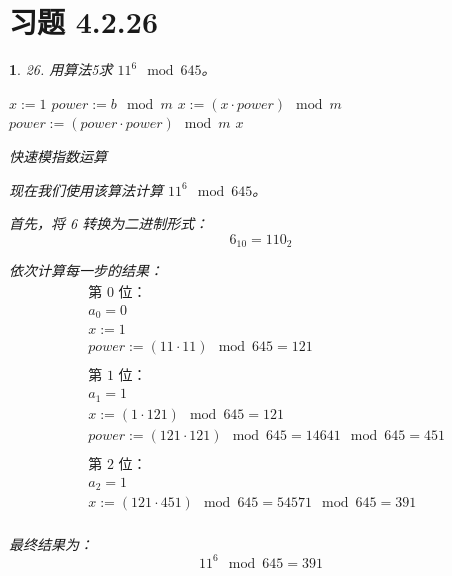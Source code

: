 \documentclass[UTF8]{report}
\theoremstyle{MyLineTheoremStyle} %
\theoremstyle{MyBlockTheoremStyle} %
\theoremstyle{MySubsubsectionStyle} %
\newtheorem{definition}{}
\begin{document}
\section{习题 4.2.26}

\begin{definition}
    26. 用算法5求 \( 11^{6} \mod 645 \)。
    \begin{algorithm}
        \begin{algorithmic}[5]
            \State $x := 1$
            \State $power := b \mod m$
                    \State $x := (x \cdot power) \mod m$
                \EndIf
                \State $power := (power \cdot power) \mod m$
            \EndFor
            \State \Return $x$ 
        \EndProcedure
        \end{algorithmic}
        \caption{快速模指数运算}
    \end{algorithm}

    现在我们使用该算法计算 \( 11^{6} \mod 645 \)。

    首先，将 6 转换为二进制形式：
    \[
    6_{10} = 110_2
    \]

    依次计算每一步的结果：
    \[
    \begin{aligned}
        &\text{第 0 位：} \\
        &a_0 = 0 \\
        &x := 1 \\
        &power := (11 \cdot 11) \mod 645 = 121 \\
        \\
        &\text{第 1 位：} \\
        &a_1 = 1 \\
        &x := (1 \cdot 121) \mod 645 = 121 \\
        &power := (121 \cdot 121) \mod 645 = 14641 \mod 645 = 451 \\
        \\
        &\text{第 2 位：} \\
        &a_2 = 1 \\
        &x := (121 \cdot 451) \mod 645 = 54571 \mod 645 = 391 \\
    \end{aligned}
    \]

    最终结果为：
    \[
    11^{6} \mod 645 = 391
    \]
\end{definition}
\end{document}
